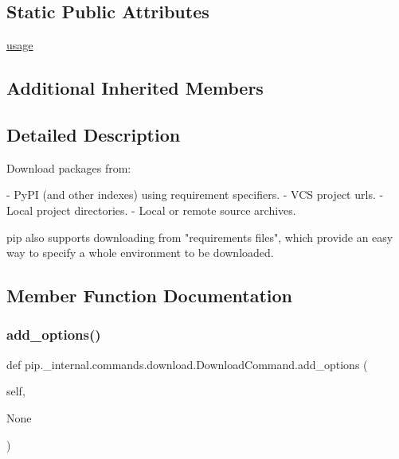 \subsection*{Static Public Attributes}
\begin{DoxyCompactItemize}
\item 
\hyperlink{classpip_1_1__internal_1_1commands_1_1download_1_1DownloadCommand_a7e654b049921426b517f1d506ac03198}{usage}
\end{DoxyCompactItemize}
\subsection*{Additional Inherited Members}


\subsection{Detailed Description}
\begin{DoxyVerb}Download packages from:

- PyPI (and other indexes) using requirement specifiers.
- VCS project urls.
- Local project directories.
- Local or remote source archives.

pip also supports downloading from "requirements files", which provide
an easy way to specify a whole environment to be downloaded.
\end{DoxyVerb}
 

\subsection{Member Function Documentation}
\mbox{\label{classpip_1_1__internal_1_1commands_1_1download_1_1DownloadCommand_a47da54359286bf97f1361e4ee96fdc56}} 
\subsubsection{\texorpdfstring{add\+\_\+options()}{add\_options()}}
{\footnotesize\ttfamily def pip.\+\_\+internal.\+commands.\+download.\+Download\+Command.\+add\+\_\+options (\begin{DoxyParamCaption}\item[{}]{self,  }\item[{}]{None }\end{DoxyParamCaption})}

